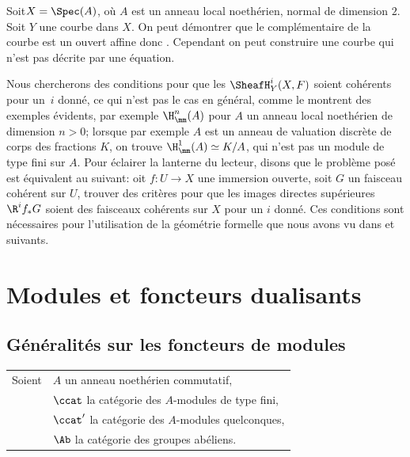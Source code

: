 \begin{exemple} \label{III.3.13}
Soit\pageoriginale $X=\Spec (A)$, o\`u $A$ est un anneau local noeth\'erien, normal de dimension $2$. Soit $Y$ une courbe dans $X$. On peut d\'emontrer que le compl\'ementaire de la courbe est un ouvert affine donc . Cependant on peut construire une courbe qui n'est pas d\'ecrite par une \'equation.
\end{exemple}

Nous chercherons des conditions pour que les $\SheafH_Y^i(X, F)$ soient coh\'erents pour un~$i$ donn\'e, ce qui n'est pas le cas en g\'en\'eral, comme le montrent des exemples \'evidents, par exemple $\H_\mm^n(A)$ pour $A$ un anneau local noeth\'erien de dimension $n>0$; lorsque par exemple $A$ est un anneau de valuation discr\`ete de corps des fractions $K$, on trouve $\H_\mm^1(A) \simeq K/A$, qui n'est pas un module de type fini sur $A$. Pour \'eclairer la lanterne du lecteur, disons que le probl\`eme pos\'e est \'equivalent au suivant: oit $f:U\to X$ une immersion ouverte, soit $G$ un faisceau coh\'erent sur $U$, trouver des crit\`eres pour que les images directes sup\'erieures $\R^i f_* G$ soient des faisceaux coh\'erents sur $X$ pour un $i$ donn\'e. Ces conditions sont n\'ecessaires pour l'utilisation de la g\'eom\'etrie formelle que nous avons vu dans   et  suivants.

\chapter{Modules et foncteurs dualisants} \label{IV}

\section{G\'en\'eralit\'es sur les foncteurs de modules} \label{IV.1}
\pageoriginale\ignorespaces
\hspace*{-3mm}
\begin{tabular}{ll}
Soient &$A$ un anneau noeth\'erien commutatif,\\
&$\ccat$ la cat\'egorie des $A$-modules de type fini,\\
&$\ccat'$ la cat\'egorie des $A$-modules quelconques,\\
&$\Ab$ la cat\'egorie des groupes ab\'eliens.{toto}\label{pIV.1}
\end{tabular}

